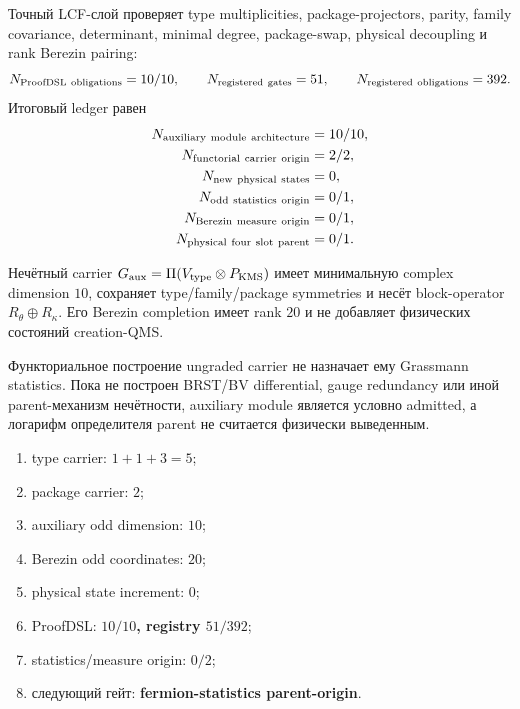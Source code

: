 Точный LCF-слой проверяет type multiplicities, package-projectors, parity,
family covariance, determinant, minimal degree, package-swap, physical
decoupling и rank Berezin pairing:
\begin{equation}
 N_{\rm ProofDSL\ obligations}=10/10,
 \qquad
 N_{\rm registered\ gates}=51,
 \qquad
 N_{\rm registered\ obligations}=392.
 \label{eq:v9-kms-aux-fermion-proofdsl}
\end{equation}
Итоговый ledger равен
\begin{equation}
 \begin{aligned}
 N_{\rm auxiliary\ module\ architecture}&=10/10,\\
 N_{\rm functorial\ carrier\ origin}&=2/2,\\
 N_{\rm new\ physical\ states}&=0,\\
 N_{\rm odd\ statistics\ origin}&=0/1,\\
 N_{\rm Berezin\ measure\ origin}&=0/1,\\
 N_{\rm physical\ four\ slot\ parent}&=0/1.
 \end{aligned}
 \label{eq:v9-kms-aux-fermion-final-ledger}
\end{equation}

\begin{theorem}
Нечётный carrier
$G_{\rm aux}=\Pi(V_{\rm type}\otimes P_{\rm KMS})$ имеет минимальную
complex dimension $10$, сохраняет type/family/package symmetries и несёт
block-operator $R_\theta\oplus R_\kappa$. Его Berezin completion имеет
rank $20$ и не добавляет физических состояний creation-QMS.
\end{theorem}

\begin{nogocriterion}
Функториальное построение ungraded carrier не назначает ему Grassmann
statistics. Пока не построен BRST/BV differential, gauge redundancy или
иной parent-механизм нечётности, auxiliary module является условно
admitted, а логарифм определителя parent не считается физически выведенным.
\end{nogocriterion}

\begin{protocol}\begin{enumerate}
\item type carrier: \textbf{$1+1+3=5$};
\item package carrier: \textbf{$2$};
\item auxiliary odd dimension: \textbf{$10$};
\item Berezin odd coordinates: \textbf{$20$};
\item physical state increment: \textbf{$0$};
\item ProofDSL: \textbf{$10/10$, registry $51/392$};
\item statistics/measure origin: \textbf{$0/2$};
\item следующий гейт: \textbf{fermion-statistics parent-origin}.
\end{enumerate}\end{protocol}

